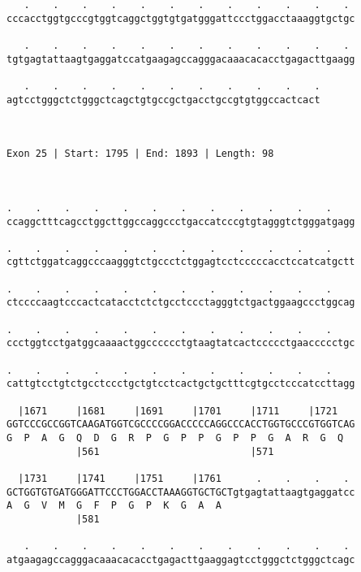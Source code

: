 \documentclass{article}
\begin{document}
\begin{Verbatim}
   .    .    .    .    .    .    .    .    .    .    .    . 
cccacctggtgcccgtggtcaggctggtgtgatgggattccctggacctaaaggtgctgc
                                                            
   .    .    .    .    .    .    .    .    .    .    .    . 
tgtgagtattaagtgaggatccatgaagagccagggacaaacacacctgagacttgaagg
                                                            
   .    .    .    .    .    .    .    .    .    .    .
agtcctgggctctgggctcagctgtgccgctgacctgccgtgtggccactcact
                                                      
                                                      
 
Exon 25 | Start: 1795 | End: 1893 | Length: 98



.    .    .    .    .    .    .    .    .    .    .    .    
ccaggctttcagcctggcttggccaggccctgaccatcccgtgtagggtctgggatgagg
                                                            
.    .    .    .    .    .    .    .    .    .    .    .    
cgttctggatcaggcccaagggtctgccctctggagtcctcccccacctccatcatgctt
                                                            
.    .    .    .    .    .    .    .    .    .    .    .    
ctccccaagtcccactcatacctctctgcctccctagggtctgactggaagccctggcag
                                                            
.    .    .    .    .    .    .    .    .    .    .    .    
ccctggtcctgatggcaaaactggcccccctgtaagtatcactccccctgaaccccctgc
                                                            
.    .    .    .    .    .    .    .    .    .    .    .    
cattgtcctgtctgcctccctgctgtcctcactgctgctttcgtgcctcccatccttagg
                                                            
  |1671     |1681     |1691     |1701     |1711     |1721   
GGTCCCGCCGGTCAAGATGGTCGCCCCGGACCCCCAGGCCCACCTGGTGCCCGTGGTCAG
G  P  A  G  Q  D  G  R  P  G  P  P  G  P  P  G  A  R  G  Q  
            |561                          |571              
  
  |1731     |1741     |1751     |1761      .    .    .    . 
GCTGGTGTGATGGGATTCCCTGGACCTAAAGGTGCTGCTgtgagtattaagtgaggatcc
A  G  V  M  G  F  P  G  P  K  G  A  A                       
            |581                                            
  
   .    .    .    .    .    .    .    .    .    .    .    . 
atgaagagccagggacaaacacacctgagacttgaaggagtcctgggctctgggctcagc
                                                            

\end{Verbatim}
\end{document}
